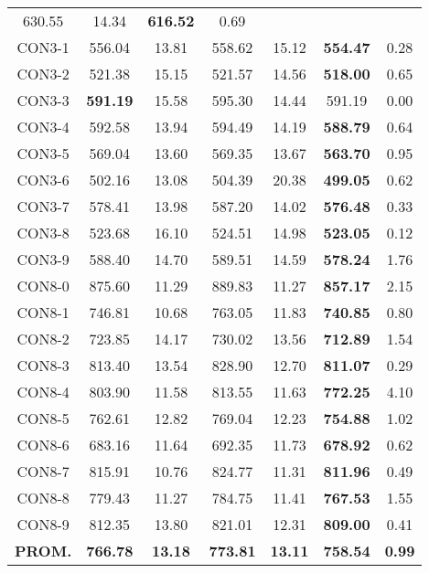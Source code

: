 \begin{table}[ht]
\begin{tabular}{c c c c c c c}
630.55 & 14.34 & \bf{616.52} & 
0.69\\CON3-1 & 556.04 & 13.81 & 
558.62 & 15.12 & \bf{554.47} & 
0.28\\CON3-2 & 521.38 & 15.15 & 
521.57 & 14.56 & \bf{518.00} & 
0.65\\CON3-3 & \bf{591.19} & 15.58 & 
595.30 & 14.44 & 591.19 & 0.00\\
CON3-4 & 592.58 & 13.94 & 
594.49 & 14.19 & \bf{588.79} & 
0.64\\CON3-5 & 569.04 & 13.60 & 
569.35 & 13.67 & \bf{563.70} & 
0.95\\CON3-6 & 502.16 & 13.08 & 
504.39 & 20.38 & \bf{499.05} & 
0.62\\CON3-7 & 578.41 & 13.98 & 
587.20 & 14.02 & \bf{576.48} & 
0.33\\CON3-8 & 523.68 & 16.10 & 
524.51 & 14.98 & \bf{523.05} & 
0.12\\CON3-9 & 588.40 & 14.70 & 
589.51 & 14.59 & \bf{578.24} & 
1.76\\CON8-0 & 875.60 & 11.29 & 
889.83 & 11.27 & \bf{857.17} & 
2.15\\CON8-1 & 746.81 & 10.68 & 
763.05 & 11.83 & \bf{740.85} & 
0.80\\CON8-2 & 723.85 & 14.17 & 
730.02 & 13.56 & \bf{712.89} & 
1.54\\CON8-3 & 813.40 & 13.54 & 
828.90 & 12.70 & \bf{811.07} & 
0.29\\CON8-4 & 803.90 & 11.58 & 
813.55 & 11.63 & \bf{772.25} & 
4.10\\CON8-5 & 762.61 & 12.82 & 
769.04 & 12.23 & \bf{754.88} & 
1.02\\CON8-6 & 683.16 & 11.64 & 
692.35 & 11.73 & \bf{678.92} & 
0.62\\CON8-7 & 815.91 & 10.76 & 
824.77 & 11.31 & \bf{811.96} & 
0.49\\CON8-8 & 779.43 & 11.27 & 
784.75 & 11.41 & \bf{767.53} & 
1.55\\CON8-9 & 812.35 & 13.80 & 
821.01 & 12.31 & \bf{809.00} & 
0.41\\\bf{PROM.} & 
\bf{766.78} & \bf{13.18} & \bf{773.81} & \bf{13.11} & \bf{758.54} & \bf{0.99}\\[1ex]\hline
\end{tabular}
\label{table:nonlin}
\end{table} \clearpage
